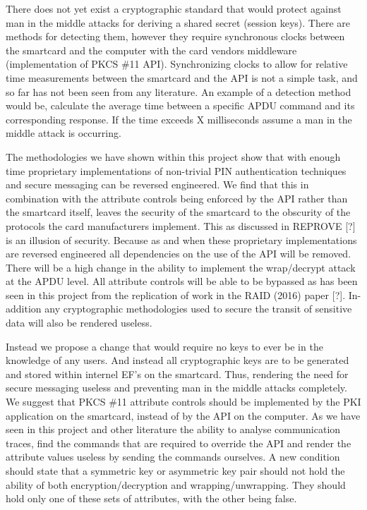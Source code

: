 \documentclass[bsc,frontabs,twoside,singlespacing,parskip,deptreport]{infthesis}     %
\begin{document}
There does not yet exist a cryptographic standard that would protect against man in the middle attacks for deriving a shared secret (session keys). There are methods for detecting them, however they require synchronous clocks between the smartcard and the computer with the card vendors middleware (implementation of PKCS \#11 API). Synchronizing clocks to allow for relative time measurements between the smartcard and the API is not a simple task, and so far has not been seen from any literature. An example of a detection method would be, calculate the average time between a specific APDU command and its corresponding response. If the time exceeds X milliseconds assume a man in the middle attack is occurring. 

The methodologies we have shown within this project show that with enough time proprietary implementations of non-trivial PIN authentication techniques and secure messaging can be reversed engineered. We find that this in combination with the attribute controls being enforced by the API rather than the smartcard itself, leaves the security of the smartcard to the obscurity of the protocols the card manufacturers implement. This as discussed in REPROVE [?] is an illusion of security. Because as and when these proprietary implementations are reversed engineered all dependencies on the use of the API will be removed. There will be a high change in the ability to implement the wrap/decrypt attack at the APDU level. All attribute controls will be able to be bypassed as has been seen in this project from the replication of work in the RAID (2016) paper [?]. In-addition any cryptographic methodologies used to secure the transit of sensitive data will also be rendered useless.

Instead we propose a change that would require no keys to ever be in the knowledge of any users. And instead all cryptographic keys are to be generated and stored within internel EF's on the smartcard. Thus, rendering the need for secure messaging useless and preventing man in the middle attacks completely. We suggest that PKCS \#11 attribute controls should be implemented by the PKI application on the smartcard, instead of by the API on the computer. As we have seen in this project and other literature the ability to analyse communication traces, find the commands that are required to override the API and render the attribute values useless by sending the commands ourselves. A new condition should state that a symmetric key or asymmetric key pair should not hold the ability of both encryption/decryption and wrapping/unwrapping. They should hold only one of these sets of attributes, with the other being false.
\end{document}
